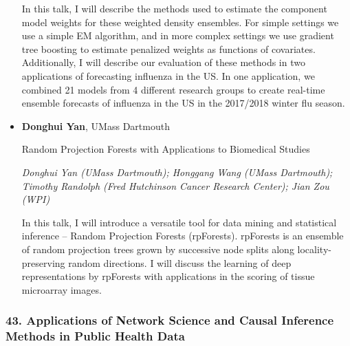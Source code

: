 \begin{itemize}
In this talk, I will describe the methods used to estimate the component model weights for these weighted density ensembles. For simple settings we use a simple EM algorithm, and in more complex settings we use gradient tree boosting to estimate penalized weights as functions of covariates. Additionally, I will describe our evaluation of these methods in two applications of forecasting influenza in the US. In one application, we combined 21 models from 4 different research groups to create real-time ensemble forecasts of influenza in the US in the 2017/2018 winter flu season.

\item \textbf{Donghui Yan}, UMass Dartmouth

Random Projection Forests with Applications to Biomedical Studies

\emph{\footnotesize Donghui Yan (UMass Dartmouth); Honggang Wang (UMass Dartmouth); Timothy Randolph (Fred Hutchinson Cancer Research Center); Jian Zou (WPI)}

In this talk, I will introduce a versatile tool for data mining and statistical inference -- Random Projection Forests (rpForests). rpForests is an ensemble of random projection trees grown by successive node splits along locality-preserving random directions. I will discuss the learning of deep representations by rpForests with applications in the scoring of tissue microarray images.

\end{itemize}

\subsubsection*{43. Applications of Network Science and Causal Inference Methods in Public Health Data}

